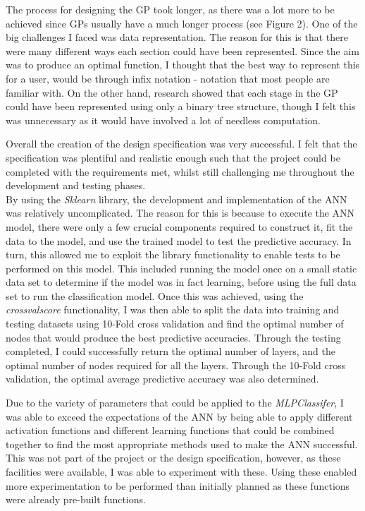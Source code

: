 \documentclass[11pt]{article}
\begin{document}
The process for designing the GP took longer, as there was a lot more to be achieved since GPs usually have a much longer process (see Figure 2). One of the big challenges I faced was data representation. The reason for this is that there were many different ways each section could have been represented. Since the aim was to produce an optimal function, I thought that the best way to represent this for a user, would be through infix notation - notation that most people are familiar with. On the other hand, research showed that each stage in the GP could have been represented using only a binary tree structure, though I felt this was unnecessary as it would have involved a lot of needless computation. 

Overall the creation of the design specification was very successful. I felt that the specification was plentiful and realistic enough such that the project could be completed with the requirements met, whilst still challenging me throughout the development and testing phases. \\

By using the \textit{Sklearn} library, the development and implementation of the ANN was relatively uncomplicated. The reason for this is because to execute the ANN model, there were only a few crucial components required to construct it, fit the data to the model, and use the trained model to test the predictive accuracy. In turn, this allowed me to exploit the library functionality to enable tests to be performed on this model. This included running the model once on a small static data set to determine if the model was in fact learning, before using the full data set to run the classification model. Once this was achieved, using the \textit{cross\textunderscore val\textunderscore score} functionality, I was then able to split the data into training and testing datasets using 10-Fold cross validation and find the optimal number of nodes that would produce the best predictive accuracies. Through the testing completed, I could successfully return the optimal number of layers, and the optimal number of nodes required for all the layers. Through the 10-Fold cross validation, the optimal average predictive accuracy was also determined.

Due to the variety of parameters that could be applied to the \textit{MLPClassifer}, I was able to exceed the expectations of the ANN by being able to apply different activation functions and different learning functions that could be combined together to find the most appropriate methods used to make the ANN successful. This was not part of the project or the design specification, however, as these facilities were available, I was able to experiment with these. Using these enabled more experimentation to be performed than initially planned as these functions were already pre-built functions. 
\end{document}
